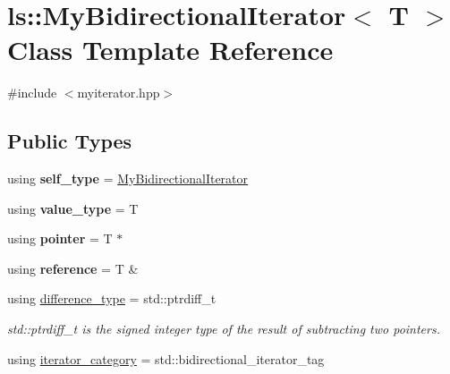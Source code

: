 \hypertarget{classls_1_1MyBidirectionalIterator}{}\section{ls\+:\+:My\+Bidirectional\+Iterator$<$ T $>$ Class Template Reference}
\label{classls_1_1MyBidirectionalIterator}


{\ttfamily \#include $<$myiterator.\+hpp$>$}

\subsection*{Public Types}
\begin{DoxyCompactItemize}
\item 
using {\bfseries self\+\_\+type} = \hyperlink{classls_1_1MyBidirectionalIterator}{My\+Bidirectional\+Iterator}\hypertarget{classls_1_1MyBidirectionalIterator_af766bc76128ad6d37de8921c0b140c63}{}\label{classls_1_1MyBidirectionalIterator_af766bc76128ad6d37de8921c0b140c63}

\item 
using {\bfseries value\+\_\+type} = T\hypertarget{classls_1_1MyBidirectionalIterator_ae4847cb2af2add0257e1a6dd91673c7d}{}\label{classls_1_1MyBidirectionalIterator_ae4847cb2af2add0257e1a6dd91673c7d}

\item 
using {\bfseries pointer} = T $\ast$\hypertarget{classls_1_1MyBidirectionalIterator_ab47ef144191f530f40a19532ad841b89}{}\label{classls_1_1MyBidirectionalIterator_ab47ef144191f530f40a19532ad841b89}

\item 
using {\bfseries reference} = T \&\hypertarget{classls_1_1MyBidirectionalIterator_ad1523807f2195de11dab514ffb394b88}{}\label{classls_1_1MyBidirectionalIterator_ad1523807f2195de11dab514ffb394b88}

\item 
using \hyperlink{classls_1_1MyBidirectionalIterator_a4f1b64a39dc7c11d9259354d1a5753ee}{difference\+\_\+type} = std\+::ptrdiff\+\_\+t
\begin{DoxyCompactList}\small\item\em std\+::ptrdiff\+\_\+t is the signed integer type of the result of subtracting two pointers. \end{DoxyCompactList}\item 
using \hyperlink{classls_1_1MyBidirectionalIterator_aac72a0b8efee1d61f3382e6ca35444d5}{iterator\+\_\+category} = std\+::bidirectional\+\_\+iterator\+\_\+tag
\end{DoxyCompactItemize}
